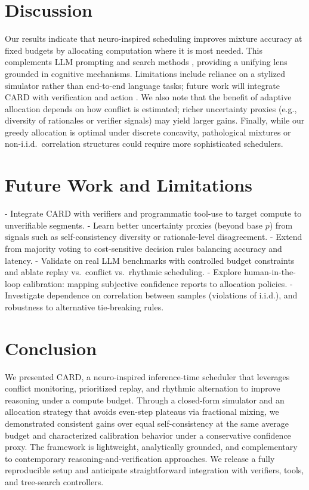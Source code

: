 \documentclass[11pt]{article}
\begin{document}
\section{Discussion}
Our results indicate that neuro-inspired scheduling improves mixture accuracy at fixed budgets by allocating computation where it is most needed.
This complements LLM prompting and search methods \citep{Wei2022CoT,Wang2023SelfConsistency,Yao2023ToT,Shinn2023Reflexion}, providing a unifying lens grounded in cognitive mechanisms.
Limitations include reliance on a stylized simulator rather than end-to-end language tasks; future work will integrate CARD with verification \citep{Lightman2023LetsVerify} and action \citep{Yao2023ReAct}.
We also note that the benefit of adaptive allocation depends on how conflict is estimated; richer uncertainty proxies (e.g., diversity of rationales or verifier signals) may yield larger gains.
Finally, while our greedy allocation is optimal under discrete concavity, pathological mixtures or non-i.i.d.\ correlation structures could require more sophisticated schedulers.

\section{Future Work and Limitations}
- Integrate CARD with verifiers and programmatic tool-use to target compute to unverifiable segments.
- Learn better uncertainty proxies (beyond base $p$) from signals such as self-consistency diversity or rationale-level disagreement.
- Extend from majority voting to cost-sensitive decision rules balancing accuracy and latency.
- Validate on real LLM benchmarks with controlled budget constraints and ablate replay vs.\ conflict vs.\ rhythmic scheduling.
- Explore human-in-the-loop calibration: mapping subjective confidence reports to allocation policies.
- Investigate dependence on correlation between samples (violations of i.i.d.), and robustness to alternative tie-breaking rules.

\section{Conclusion}
We presented CARD, a neuro-inspired inference-time scheduler that leverages conflict monitoring, prioritized replay, and rhythmic alternation to improve reasoning under a compute budget.
Through a closed-form simulator and an allocation strategy that avoids even-step plateaus via fractional mixing, we demonstrated consistent gains over equal self-consistency at the same average budget and characterized calibration behavior under a conservative confidence proxy.
The framework is lightweight, analytically grounded, and complementary to contemporary reasoning-and-verification approaches.
We release a fully reproducible setup and anticipate straightforward integration with verifiers, tools, and tree-search controllers.
\end{document}
